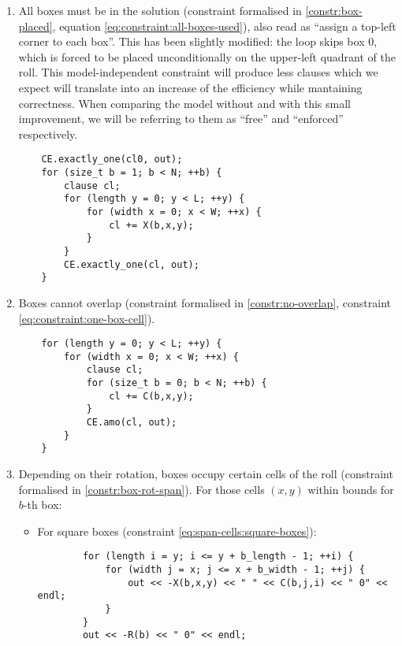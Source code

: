 \begin{enumerate}
	\item All boxes must be in the solution (constraint formalised in
	\ref{constr:box-placed}, equation \ref{eq:constraint:all-boxes-used}),
	also read as ``assign a top-left corner to each box''. This has been
	slightly modified: the loop skips box 0, which is forced to be placed
	unconditionally on the upper-left quadrant of the roll. This model-independent
	constraint will produce less clauses which we expect will translate into an
	increase of the efficiency while mantaining correctness. When comparing the
	model without and with this small improvement, we will be referring to them
	as ``free'' and ``enforced'' respectively.
    
	{\NOINDENT \begin{lstlisting}
	CE.exactly_one(cl0, out);
	for (size_t b = 1; b < N; ++b) {
		clause cl;
		for (length y = 0; y < L; ++y) {
			for (width x = 0; x < W; ++x) {
				cl += X(b,x,y);
			}
		}
		CE.exactly_one(cl, out);
	}
	\end{lstlisting}}
    
	\item Boxes cannot overlap (constraint formalised in
	\ref{constr:no-overlap}, constraint \ref{eq:constraint:one-box-cell}).
    
	{\NOINDENT \begin{lstlisting}
	for (length y = 0; y < L; ++y) {
		for (width x = 0; x < W; ++x) {
			clause cl;
			for (size_t b = 0; b < N; ++b) {
				cl += C(b,x,y);
			}
			CE.amo(cl, out);
		}
	}
	\end{lstlisting}}
    
	\item Depending on their rotation, boxes occupy certain cells of the roll
	(constraint formalised in \ref{constr:box-rot-span}). For those cells $(x,y)$ within
	bounds for $b$-th box:

	\begin{itemize}
		\item For square boxes (constraint \ref{eq:span-cells:square-boxes}):
		{\NOINDENT \begin{lstlisting}
		for (length i = y; i <= y + b_length - 1; ++i) {
			for (width j = x; j <= x + b_width - 1; ++j) {
				out << -X(b,x,y) << " " << C(b,j,i) << " 0" << endl;
			}
		}
		out << -R(b) << " 0" << endl;
		\end{lstlisting}}
		

\end{itemize}
\end{enumerate}

